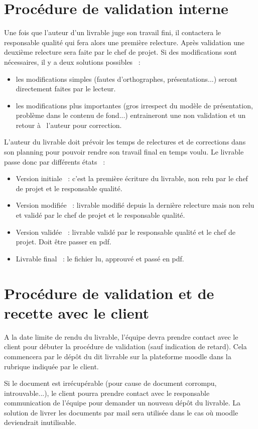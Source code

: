 \section{Procédure de validation interne}
  Une fois que l'auteur d'un livrable juge son travail fini, il contactera le responsable qualité qui fera alors une première relecture. Après validation une deuxième relecture sera faite par le chef de projet.
Si des modifications sont nécessaires, il y a deux solutions possibles  :
\begin{itemize}
    \item les modifications simples (fautes d'orthographes, présentations...) seront directement faites par le lecteur.
    \item les modifications plus importantes (gros irrespect du modèle de présentation, problème dans le contenu de fond...) entraineront une non validation et un retour à  l'auteur pour correction.
\end{itemize}
    L'auteur du livrable doit prévoir les temps de relectures et de corrections dans son planning pour pouvoir rendre son travail final en temps voulu.
    Le livrable passe donc par différents états  :
\begin{itemize}
    \item Version initiale  : c'est la première écriture du livrable, non relu par le chef de projet et le responsable qualité.
    \item Version modifiée  : livrable modifié depuis la dernière relecture mais non relu et validé par le chef de projet et le responsable qualité.
    \item Version validée  : livrable validé par le responsable qualité et le chef de projet. Doit être passer en pdf.
    \item Livrable final  : le fichier lu, approuvé et passé en pdf.
\end{itemize}

\section{Procédure de validation et de recette avec le client}
    A la date limite de rendu du livrable, l'équipe devra prendre contact avec le client pour débuter la procédure de validation (sauf indication de retard). Cela commencera par le dépôt du dit livrable sur la plateforme moodle dans la rubrique indiquée par le client.

    Si le document est irrécupérable (pour cause de document corrompu, introuvable...), le client pourra prendre contact avec le responsable communication de l'équipe pour demander un nouveau dépôt du livrable. La solution de livrer les documents par mail sera utilisée dans le cas où moodle deviendrait inutilisable.

